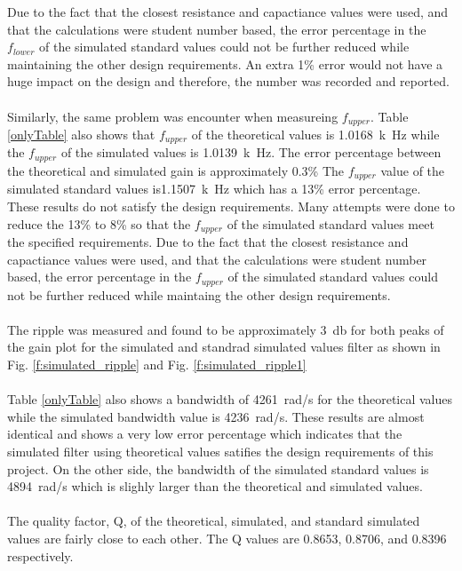 \documentclass[hidelinks]{article}
\begin{document}
	Due to the fact that the closest resistance and capactiance values were used, and that the calculations were student number based, the error percentage in the $f_{lower}$ of the simulated standard values could not be further reduced while maintaining the other design requirements.
	An extra 1\% error would not have a huge impact on the design and therefore, the number was recorded and reported.\\\\
	Similarly, the same problem was encounter when measureing $f_{upper}$.
	Table \ref{onlyTable} also shows that $f_{upper}$ of the theoretical values is \SI{1.0168}{k\hertz} while the $f_{upper}$ of the simulated values is \SI{1.0139}{k\hertz}.
	The error percentage between the theoretical and simulated gain is approximately 0.3\%
	The $f_{upper}$ value of the simulated standard values is\SI{1.1507}{k\hertz} which has a 13\% error percentage.	
	These results do not satisfy the design requirements.
	Many attempts were done to reduce the 13\% to 8\% so that the $f_{upper}$ of the simulated standard values meet the specified requirements.	
	Due to the fact that the closest resistance and capactiance values were used, and that the calculations were student number based, the error percentage in the $f_{upper}$ of the simulated standard values could not be further reduced while maintaing the other design requirements.\\\\
	The ripple was measured and found to be approximately \SI{3}{\decibel} for both peaks of the gain plot for the simulated and standrad simulated values filter as shown in Fig. \ref{f:simulated_ripple} and Fig. \ref{f:simulated_ripple1}\\\\
	Table \ref{onlyTable} also shows a bandwidth of \SI{4261}{\radian/\second} for the theoretical values while the simulated bandwidth value is  \SI{4236}{\radian/\second}.
	These results are almost identical and shows a very low error percentage which indicates that the simulated filter using theoretical values satifies the design requirements of this project.
	On the other side, the bandwidth of the simulated standard values is \SI{4894}{\radian/\second} which is slighly larger than the theoretical and simulated values.\\\\
	The quality factor, Q, of the theoretical, simulated, and standard simulated values are fairly close to each other. 
	The Q values are 0.8653, 0.8706, and 0.8396 respectively.\\\\
\end{document}

